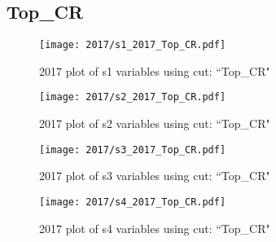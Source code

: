 \documentclass{article}
\begin{document}
      \subsection*{Top\_CR}
                        \begin{figure}[H]
                            \centering
                            \caption{2017 plot of s1 variables using cut: ``Top\_CR"}
                            \texttt{[image: 2017/s1\_2017\_Top\_CR.pdf]}
                        \end{figure}    
                        \begin{figure}[H]
                            \centering
                            \caption{2017 plot of s2 variables using cut: ``Top\_CR"}
                            \texttt{[image: 2017/s2\_2017\_Top\_CR.pdf]}
                        \end{figure}    
                        \begin{figure}[H]
                            \centering
                            \caption{2017 plot of s3 variables using cut: ``Top\_CR"}
                            \texttt{[image: 2017/s3\_2017\_Top\_CR.pdf]}
                        \end{figure}    
                        \begin{figure}[H]
                            \centering
                            \caption{2017 plot of s4 variables using cut: ``Top\_CR"}
                            \texttt{[image: 2017/s4\_2017\_Top\_CR.pdf]}
                        \end{figure}    
\end{document}

